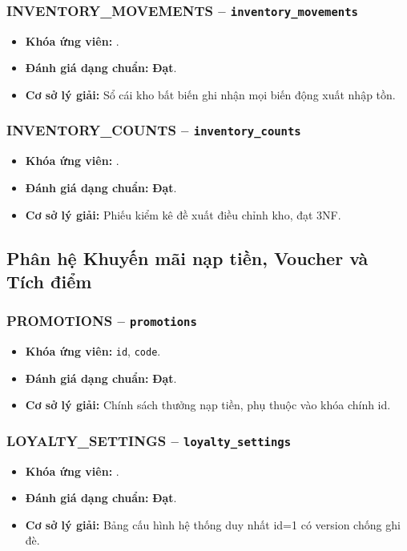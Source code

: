 \subsubsection{INVENTORY_MOVEMENTS -- \texttt{inventory\_movements}}
\begin{itemize}
  \item \textbf{Khóa ứng viên:} \texttt{}.
  \item \textbf{Đánh giá dạng chuẩn:} \textbf{Đạt}.
  \item \textbf{Cơ sở lý giải:} Sổ cái kho bất biến ghi nhận mọi biến động xuất nhập tồn.
\end{itemize}

\subsubsection{INVENTORY_COUNTS -- \texttt{inventory\_counts}}
\begin{itemize}
  \item \textbf{Khóa ứng viên:} \texttt{}.
  \item \textbf{Đánh giá dạng chuẩn:} \textbf{Đạt}.
  \item \textbf{Cơ sở lý giải:} Phiếu kiểm kê đề xuất điều chỉnh kho, đạt 3NF.
\end{itemize}

\subsection{Phân hệ Khuyến mãi nạp tiền, Voucher và Tích điểm}
\subsubsection{PROMOTIONS -- \texttt{promotions}}
\begin{itemize}
  \item \textbf{Khóa ứng viên:} \texttt{id}, \texttt{code}.
  \item \textbf{Đánh giá dạng chuẩn:} \textbf{Đạt}.
  \item \textbf{Cơ sở lý giải:} Chính sách thưởng nạp tiền, phụ thuộc vào khóa chính id.
\end{itemize}

\subsubsection{LOYALTY_SETTINGS -- \texttt{loyalty\_settings}}
\begin{itemize}
  \item \textbf{Khóa ứng viên:} \texttt{}.
  \item \textbf{Đánh giá dạng chuẩn:} \textbf{Đạt}.
  \item \textbf{Cơ sở lý giải:} Bảng cấu hình hệ thống duy nhất id=1 có version chống ghi đè.
\end{itemize}

